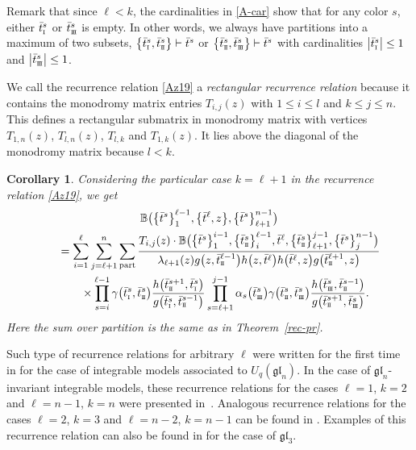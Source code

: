 \documentclass[10pt,a4paper]{amsart}
\newcommand{\so}{\scriptscriptstyle \rm I}
\newcommand{\st}{\scriptscriptstyle \rm I\hspace{-1pt}I}
\newcommand{\sth}{\scriptscriptstyle \rm I\hspace{-1pt}I\hspace{-1pt}I}
\newcommand{\bt}{{\bar t}}
\newtheorem{cor}[thm]{Corollary}
\theoremstyle{definition}
\def\BB{{\mathbb{B}}}
\def\r#1{\eqref{#1}}
\begin{document}
Remark that since $\ell<k$, the cardinalities in \eqref{A-car} show that for any color $s$, either $\bt^s_{\so}$ or $\bt^s_{\sth}$ is empty.
In other words, we always have partitions into a maximum of two subsets,
$ \bigl\{\bt^s_{\so},\bt^s_{\st}\bigr\}\vdash \bt^s$ or
$\bigl\{\bt^s_{\st},\bt^s_{\sth}\bigr\}\vdash \bt^s$
with cardinalities $\big|\bt^s_{\so}\big|\leq1$ and $\big|\bt^s_{\sth}\big|\leq1$.

We call the recurrence relation \r{Az19} a {\it rectangular recurrence relation} because
it contains the monodromy matrix entries $T_{i,j}(z)$ with $1\leq i\leq l$ and $k\leq j\leq n$.
This defines a rectangular submatrix in monodromy matrix with
vertices $T_{1,n}(z)$, $T_{l,n}(z)$, $T_{l,k}$ and $T_{1,k}(z)$. It lies above the diagonal of the monodromy matrix because $l<k$.


\begin{cor}\label{cor1}
Considering the particular case $k=\ell+1$ in the recurrence relation \r{Az19}, we get
\begin{gather*}
\BB\bigl(\bigl\{\bt^s\bigr\}_1^{\ell-1},\bigl\{\bt^\ell,z\bigr\},\bigl\{\bt^s\bigr\}_{\ell+1}^{n-1}\bigr)\\
\qquad=
\sum_{i=1}^\ell\sum_{j=\ell+1}^n\sum_{\rm part}\frac{T_{i,j}(z)\cdot
\BB\bigl(\bigl\{\bt^s\bigr\}_1^{i-1},\bigl\{\bt^s_{\st}\bigr\}_i^{\ell-1},\bt^\ell,
\bigl\{\bt^s_{\st}\bigr\}_{\ell+1}^{j-1},\bigl\{\bt^s\bigr\}_{j}^{n-1}\bigr)}
{\lambda_{\ell+1}(z) g\bigl(z,\bt^{\ell-1}_{\st}\bigr)h\bigl(z,\bt^\ell\bigr)h\bigl(\bt^\ell,z\bigr)g\bigl(\bt^{\ell+1}_{\st},z\bigr)}
\\
\qquad\phantom{=}{}\times
\prod_{s=i}^{\ell-1}\gamma\bigl(\bt^{s}_{\so},\bt^s_{\st}\bigr)
\frac{h\bigl(\bt^{s+1}_{\st},\bt^{s}_{\so}\bigr)}
{g\bigl(\bt^{s}_{\so},\bt^{s-1}_{\st}\bigr)}
\prod_{s=\ell+1}^{j-1}\alpha_s\bigl(\bt^s_{\sth}\bigr)\gamma\bigl(\bt^{s}_{\st},\bt^s_{\sth}\bigr)
\frac{h\bigl(\bt^{s}_{\sth},\bar t^{s-1}_{\st}\bigr)}{g\bigl(\bt^{s+1}_{\st},\bt^{s}_{\sth}\bigr)} .
\end{gather*}
Here the sum over partition is the same as in Theorem~{\rm\ref{rec-pr}}.
\end{cor}
Such type of recurrence relations for arbitrary $\ell$ were written for the first time in \cite{LP22} for the case of integrable
models associated to $U_q(\mathfrak{gl}_n)$. In the case of $\mathfrak{gl}_n$-invariant integrable
models, these recurrence relations for the cases $\ell=1$, $k=2$ and $\ell=n-1$, $k=n$
were presented in~\cite{HLPRS-SP17}.
Analogous recurrence relations for the cases
$\ell=2$, $k=3$ and $\ell=n-2$, $k=n-1$ can be found in \cite{G23}.
Examples of this recurrence relation can also be found in \cite{BPRS13} for the case of $\mathfrak{gl}_3$.
\end{document}
